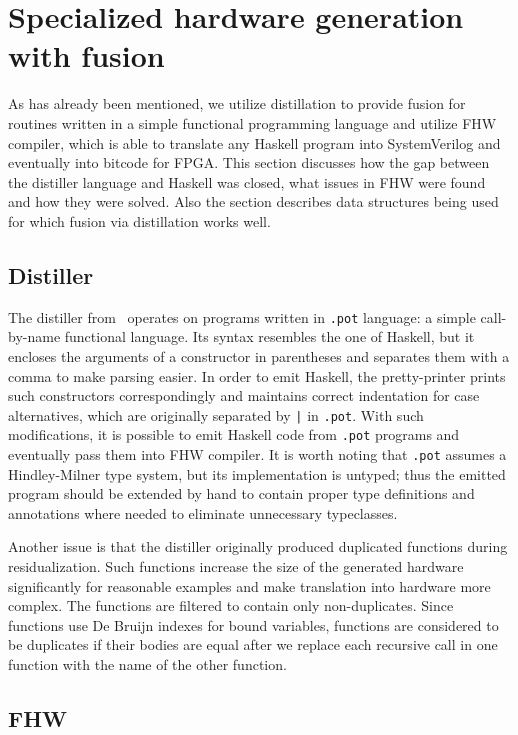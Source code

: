 \section{Specialized hardware generation with fusion}

As has already been mentioned, we utilize distillation to provide fusion for routines written in a simple functional programming language and utilize FHW compiler, which is able to translate any Haskell program into SystemVerilog and eventually into bitcode for  FPGA. This section discusses how the gap between the distiller language and Haskell was closed, what issues in FHW were found and how they were solved. Also the section describes data structures being used for which fusion via distillation works well.


\subsection{Distiller}

The distiller from~\cite{distillation} operates on programs written in \texttt{.pot} language: a simple call-by-name functional language. Its syntax resembles the one of Haskell, but it encloses the arguments of a constructor in parentheses and separates them with a comma to make parsing easier. In order to emit Haskell, the pretty-printer prints such constructors correspondingly and maintains correct indentation for case alternatives, which are originally separated by \texttt{|} in \texttt{.pot}. With such modifications, it is possible to emit Haskell code from \texttt{.pot} programs and eventually pass them into FHW compiler. It is worth noting that \texttt{.pot} assumes a Hindley-Milner type system, but its implementation is untyped; thus the emitted program should be extended by hand to contain proper type definitions and annotations where needed to eliminate unnecessary typeclasses.

Another issue is that the distiller originally produced duplicated functions during residualization. Such functions increase the size of the generated hardware significantly for reasonable examples and make translation into hardware more complex. The functions are filtered to contain only non-duplicates. Since functions use De Bruijn indexes for bound variables, functions are considered to be duplicates if their bodies are equal after we replace each recursive call in one function with the name of the other function.

\subsection{FHW}

